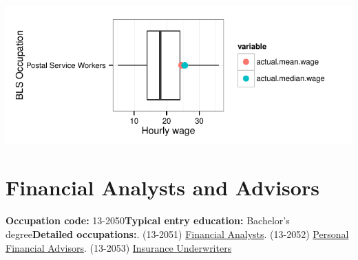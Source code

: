 \documentclass[a4paper,10pt]{article}\usepackage[]{graphicx}\usepackage[]{color}
\makeatletter
\def\maxwidth{ %
  \ifdim\Gin@nat@width>\linewidth
    \linewidth
  \else
    \Gin@nat@width
  \fi
}
\makeatother
\begin{document}
{\centering \includegraphics[width=\maxwidth]{figure/unnamed-chunk-264} 

}


\newpage\section{Financial Analysts and Advisors}\textbf{Occupation code:} 13-2050\newline\textbf{Typical entry education:} Bachelor's degree\newline\textbf{Detailed occupations:}. (13-2051)  \href{http://www.bls.gov/oes/current/oes132051.htm}{Financial Analysts}. (13-2052)  \href{http://www.bls.gov/oes/current/oes132052.htm}{Personal Financial Advisors}. (13-2053)  \href{http://www.bls.gov/oes/current/oes132053.htm}{Insurance Underwriters}\newline%
\end{document}

